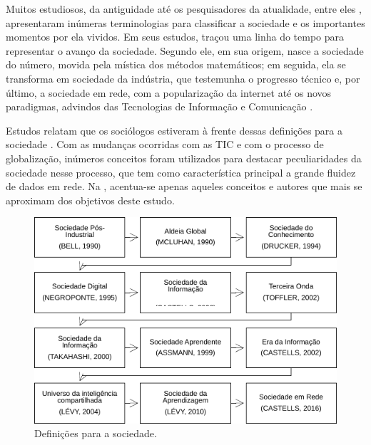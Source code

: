 \documentclass[portuguese]{textolivre}
\begin{document}
Muitos estudiosos, da antiguidade até os pesquisadores da atualidade,
entre eles \textcite{assmann1999,bell1990,castells2016,drucker1994,levy2011,mcluhan1990,negroponte1995,takahashi2000,toffler2002},
apresentaram inúmeras terminologias para classificar a
sociedade e os importantes momentos por ela vividos. Em seus estudos,
\textcite{mattelart2002} traçou uma linha do tempo para representar o avanço da
sociedade. Segundo ele, em sua origem, nasce a sociedade do número,
movida pela mística dos métodos matemáticos; em seguida, ela se
transforma em sociedade da indústria, que testemunha o progresso técnico
e, por último, a sociedade em rede, com a popularização da internet até
os novos paradigmas, advindos das Tecnologias de Informação e
Comunicação \cite{masuda2004, marcuse2011, castells2016}.

Estudos relatam que os sociólogos estiveram à frente dessas definições
para a sociedade \cite{silva2010}. Com as mudanças ocorridas com as TIC
e com o processo de globalização, inúmeros conceitos foram utilizados
para destacar peculiaridades da sociedade nesse processo, que tem como
característica principal a grande fluidez de dados em rede. Na ,
acentua-se apenas aqueles conceitos e autores que mais se aproximam dos
objetivos deste estudo.

\begin{figure}[htbp]
\centering
\begin{minipage}{.65\textwidth} 
  \includegraphics[width=\textwidth]{figura01.pdf}
  \caption{Definições para a sociedade.}
  \label{fig01}
\end{minipage}
\end{figure}
\end{document}
